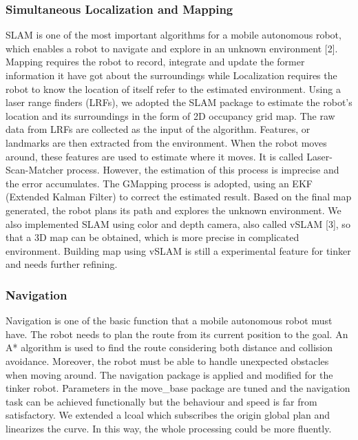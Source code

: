\subsubsection{Simultaneous Localization and Mapping}
SLAM is one of the most important algorithms for a mobile autonomous robot, which enables a robot to navigate and explore in an unknown environment [2]. Mapping requires the robot to record, integrate and update the former information it have got about the surroundings while Localization requires the robot to know the location of itself refer to the estimated environment. Using a laser range finders (LRFs), we adopted the SLAM package to estimate the robot’s location and its surroundings in the form of 2D occupancy grid map. The raw data from LRFs are collected as the input of the algorithm. Features, or landmarks are then extracted from the environment. When the robot moves around, these features are used to estimate where it moves. It is called Laser-Scan-Matcher process. However, the estimation of this process is imprecise and the error accumulates. The GMapping process is adopted, using an EKF (Extended Kalman Filter) to correct the estimated result. Based on the final map generated, the robot plans its path and explores the unknown environment.
We also implemented SLAM using color and depth camera, also called vSLAM [3], so that a 3D map can be obtained, which is more precise in complicated environment. Building map using vSLAM is still a experimental feature for tinker and needs further refining.
\subsubsection{Navigation}
Navigation is one of the basic function that a mobile autonomous robot must have. The robot needs to plan the route from its current position to the goal. An A* algorithm is used to find the route considering both distance and  collision avoidance. Moreover, the robot must be able to handle unexpected obstacles when moving around. The navigation package is applied and modified for the tinker robot. Parameters in the move_base package are tuned and the navigation task can be achieved functionally but the behaviour and speed is far from satisfactory. We extended a lcoal  which subscribes the origin global plan and linearizes the curve. In this way, the whole processing could be more fluently. 
